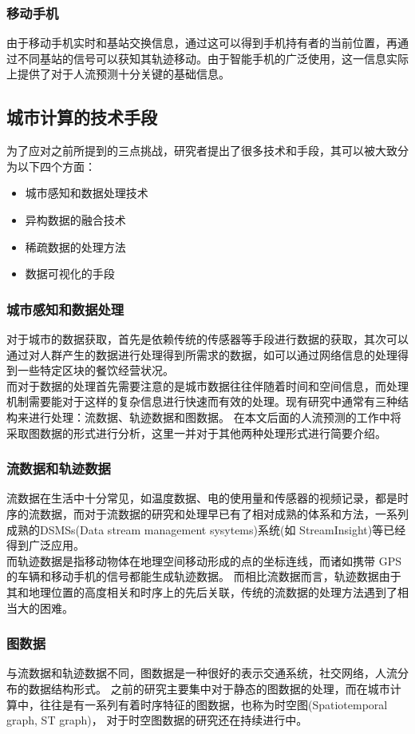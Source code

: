 \subsubsection*{移动手机}
由于移动手机实时和基站交换信息，通过这可以得到手机持有者的当前位置，再通过不同基站的信号可以获知其轨迹移动。由于智能手机的广泛使用，这一信息实际上提供了对于人流预测十分关键的基础信息。
\subsection{城市计算的技术手段}
为了应对之前所提到的三点挑战，研究者提出了很多技术和手段，其可以被大致分为以下四个方面：
\begin{itemize}
	\item 城市感知和数据处理技术
	\item 异构数据的融合技术
	\item 稀疏数据的处理方法
	\item 数据可视化的手段
\end{itemize}
\subsubsection*{城市感知和数据处理}
对于城市的数据获取，首先是依赖传统的传感器等手段进行数据的获取，其次可以通过对人群产生的数据进行处理得到所需求的数据，如可以通过网络信息的处理得到一些特定区块的餐饮经营状况。 \\
而对于数据的处理首先需要注意的是城市数据往往伴随着时间和空间信息，而处理机制需要能对于这样的复杂信息进行快速而有效的处理。现有研究中通常有三种结构来进行处理：流数据、轨迹数据和图数据。 在本文后面的人流预测的工作中将采取图数据的形式进行分析，这里一并对于其他两种处理形式进行简要介绍。
\subsubsection*{流数据和轨迹数据}
流数据在生活中十分常见，如温度数据、电的使用量和传感器的视频记录，都是时序的流数据，而对于流数据的研究和处理早已有了相对成熟的体系和方法\cite{Aggarwal2006Data}，一系列成熟的DSMSs(Data stream management sysytems)系统(如 StreamInsight)等已经得到广泛应用。\\
而轨迹数据是指移动物体在地理空间移动形成的点的坐标连线，而诸如携带 GPS 的车辆和移动手机的信号都能生成轨迹数据。 而相比流数据而言，轨迹数据由于其和地理位置的高度相关和时序上的先后关联，传统的流数据的处理方法遇到了相当大的困难\cite{Wang2011Computing}。
\subsubsection*{图数据}
与流数据和轨迹数据不同，图数据是一种很好的表示交通系统，社交网络，人流分布的数据结构形式。 之前的研究主要集中对于静态的图数据的处理\cite{angles2008survey}，而在城市计算中，往往是有一系列有着时序特征的图数据，也称为时空图\cite{hong2015detecting}(Spatiotemporal graph, ST graph)，
对于时空图数据的研究还在持续进行中。

